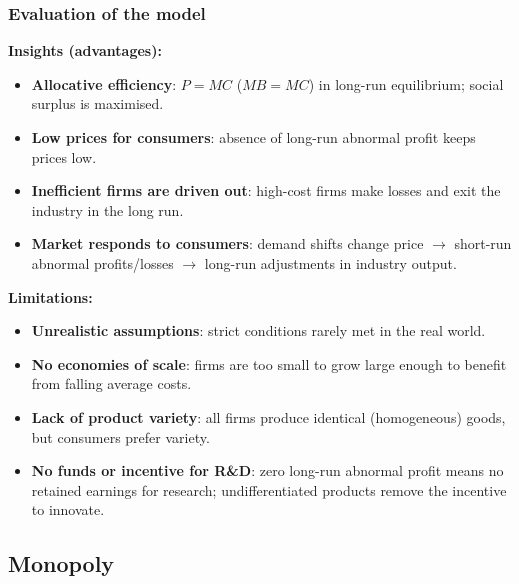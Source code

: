 \subsubsection*{Evaluation of the model}
\textbf{Insights (advantages):}
\begin{itemize}
  \item \textbf{Allocative efficiency}: $P = MC$ ($MB = MC$) in long-run equilibrium; social surplus is maximised.
  \item \textbf{Low prices for consumers}: absence of long-run abnormal profit keeps prices low.
  \item \textbf{Inefficient firms are driven out}: high-cost firms make losses and exit the industry in the long run.
  \item \textbf{Market responds to consumers}: demand shifts change price $\to$ short-run abnormal profits/losses $\to$ long-run adjustments in industry output.
\end{itemize}
\textbf{Limitations:}
\begin{itemize}
  \item \textbf{Unrealistic assumptions}: strict conditions rarely met in the real world.
  \item \textbf{No economies of scale}: firms are too small to grow large enough to benefit from falling average costs.
  \item \textbf{Lack of product variety}: all firms produce identical (homogeneous) goods, but consumers prefer variety.
  \item \textbf{No funds or incentive for R\&D}: zero long-run abnormal profit means no retained earnings for research; undifferentiated products remove the incentive to innovate.
\end{itemize}
\subsection{Monopoly}
